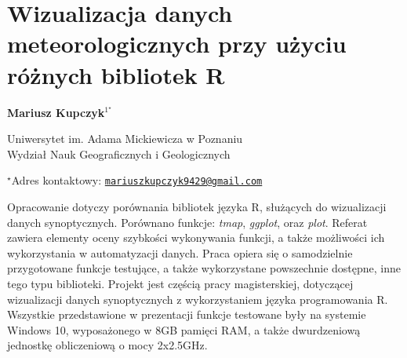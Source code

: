 \documentclass[\main/boa.tex]{subfiles}
\begin{document}
\section{Wizualizacja danych meteorologicznych przy użyciu różnych bibliotek R}

\begin{center}
  {\bf {} Mariusz Kupczyk$^{1^\star}$}
\end{center}

\vskip 0.3cm

\begin{affiliations}
\begin{enumerate}
\begin{minipage}{0.915\textwidth}
\centering
\item Uniwersytet im. Adama Mickiewicza w Poznaniu\\ Wydział Nauk Geograficznych i Geologicznych
\end{minipage}
\end{enumerate}
$^\star$Adres kontaktowy: \href{mailto:mariuszkupczyk9429@gmail.com	}{\nolinkurl{mariuszkupczyk9429@gmail.com}}\\
\end{affiliations}

\vskip 0.5cm


\vskip 0.5cm

Opracowanie dotyczy porównania bibliotek języka R, służących do wizualizacji danych synoptycznych. Porównano funkcje: \emph{tmap}, \emph{ggplot}, oraz \emph{plot}. Referat zawiera elementy oceny szybkości wykonywania funkcji, a także możliwości ich wykorzystania w automatyzacji danych. Praca opiera się o samodzielnie przygotowane funkcje testujące, a także wykorzystane powszechnie dostępne, inne tego typu biblioteki. Projekt jest częścią pracy magisterskiej, dotyczącej wizualizacji danych synoptycznych z wykorzystaniem języka programowania R. \\Wszystkie przedstawione w prezentacji funkcje testowane były na systemie Windows 10, wyposażonego w 8GB pamięci RAM, a także dwurdzeniową jednostkę obliczeniową o mocy 2x2.5GHz. 
\end{document}
